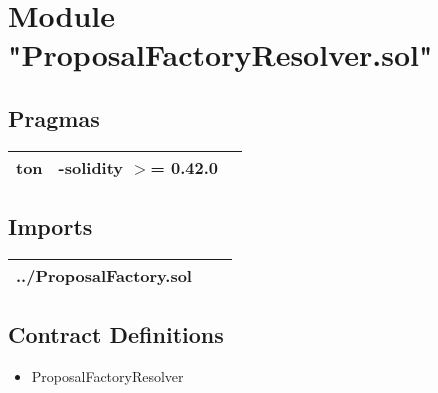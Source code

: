 
\section{Module "ProposalFactoryResolver.sol"}


\subsection{Pragmas}


\noindent\begin{tabular}{|l|l|p{5cm}|}\hline
ton & -solidity $>$= 0.42.0 &\\\hline
\end{tabular}


\subsection{Imports}


\noindent\begin{tabular}{|l|l|p{5cm}|}\hline
../ProposalFactory.sol &\\\hline
\end{tabular}


\subsection{Contract Definitions}

\begin{itemize}
\item ProposalFactoryResolver
\end{itemize}
